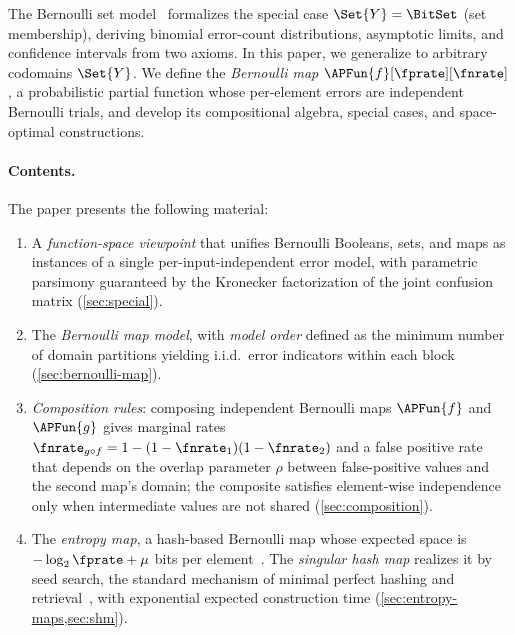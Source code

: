 \documentclass[ ../main.tex]{subfiles}
\begin{document}
The Bernoulli set model~\cite{aset} formalizes the special case $\Set{Y} = \BitSet$ (set membership), deriving binomial error-count distributions, asymptotic limits, and confidence intervals from two axioms.
In this paper, we generalize to arbitrary codomains $\Set{Y}$.
We define the \emph{Bernoulli map} $\APFun{f}[\fprate][\fnrate]$, a probabilistic partial function whose per-element errors are independent Bernoulli trials, and develop its compositional algebra, special cases, and space-optimal constructions.

\paragraph{Contents.}
The paper presents the following material:
\begin{enumerate}
\item A \emph{function-space viewpoint} that unifies Bernoulli Booleans, sets, and maps as instances of a single per-input-independent error model, with parametric parsimony guaranteed by the Kronecker factorization of the joint confusion matrix (\cref{sec:special}).

\item The \emph{Bernoulli map model}, with \emph{model order} defined as the minimum number of domain partitions yielding i.i.d.\ error indicators within each block (\cref{sec:bernoulli-map}).

\item \emph{Composition rules}: composing independent Bernoulli maps $\APFun{f}$ and $\APFun{g}$ gives marginal rates $\fnrate_{g \circ f} = 1 - (1-\fnrate_1)(1-\fnrate_2)$ and a false positive rate that depends on the overlap parameter $\rho$ between false-positive values and the second map's domain; the composite satisfies element-wise independence only when intermediate values are not shared (\cref{sec:composition}).

\item The \emph{entropy map}, a hash-based Bernoulli map whose expected space is $-\log_2 \fprate + \mu$ bits per element~\cite{shannon1959,cover2006}. The \emph{singular hash map} realizes it by seed search, the standard mechanism of minimal perfect hashing and retrieval~\cite{esposito2020recsplit,lehmann2025seeds,bhf}, with exponential expected construction time (\cref{sec:entropy-maps,sec:shm}).
\end{enumerate}
\end{document}
